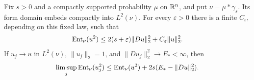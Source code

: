 \begin{lemma}
\label{lem:critical-defect}
Fix $s>0$ and a compactly supported probability $\mu$ on $\mathbb R^n$,
and put $\nu=\mu*\gamma_s$. Its form domain embeds compactly
into $L^2(\nu)$. For every $\varepsilon>0$ there is a finite
$C_\varepsilon$, depending on this fixed law, such that
\begin{equation}\label{eq:critical-defective}
 \operatorname{Ent}_\nu(u^2)\le2(s+\varepsilon)\|Du\|_2^2
                  +C_\varepsilon\|u\|_2^2.
\end{equation}
If $u_j\to u$ in $L^2(\nu)$, $\|u_j\|_2=1$, and
$\|Du_j\|_2^2\to E_*<\infty$, then
\begin{equation}\label{eq:critical-entropy-defect}
 \limsup_j\operatorname{Ent}_\nu(u_j^2)
 \le\operatorname{Ent}_\nu(u^2)+2s(E_*-\|Du\|_2^2).
\end{equation}
\end{lemma}

